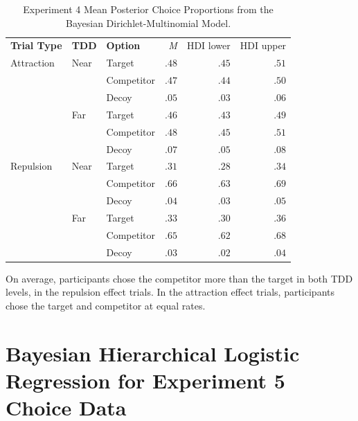 \begin{table}[ht]
    \centering
    \begin{tabular}{lllrrr}
        \toprule
        \textbf{Trial Type} & \textbf{TDD} & \textbf{Option} & \textit{M} & HDI lower & HDI upper \\
        Attraction          & Near         & Target          &  $.48$     & $.45$     & $.51$     \\
                            &              & Competitor      &  $.47$     & $.44$     & $.50$     \\
                            &              & Decoy           &  $.05$     & $.03$     & $.06$     \\
                            & Far          & Target          &  $.46$     & $.43$     & $.49$     \\
                            &              & Competitor      &  $.48$     & $.45$     & $.51$     \\
                            &              & Decoy           &  $.07$     & $.05$     & $.08$     \\
        Repulsion           & Near         & Target          &  $.31$     & $.28$     & $.34$     \\
                            &              & Competitor      &  $.66$     & $.63$     & $.69$     \\
                            &              & Decoy           &  $.04$     & $.03$     & $.05$     \\
                            & Far          & Target          &  $.33$     & $.30$     & $.36$     \\
                            &              & Competitor      &  $.65$     & $.62$     & $.68$     \\
                            &              & Decoy           &  $.03$     & $.02$     & $.04$     \\
        \bottomrule
    \end{tabular}
    \caption{Experiment 4 Mean Posterior Choice Proportions from the Bayesian Dirichlet-Multinomial Model.}
    \label{tab:e4_choice_params}
\end{table}

On average, participants chose the competitor more than the target in both TDD levels, in the repulsion effect trials. In the attraction effect trials, participants chose the target and competitor at equal rates. 

\chapter{Bayesian Hierarchical Logistic Regression for Experiment 5 Choice Data}

